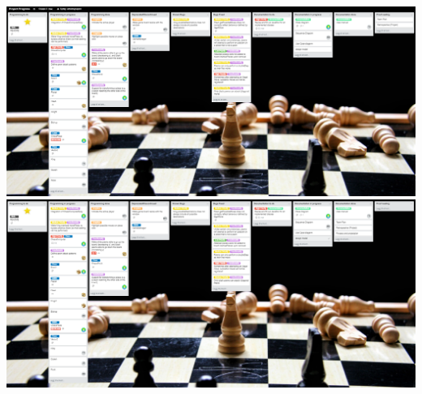 \documentclass{article}
\begin{document}
\includegraphics[width=16cm]{sc3.png} \\
\includegraphics[width=16cm]{sc4.png} \\
\end{document}

